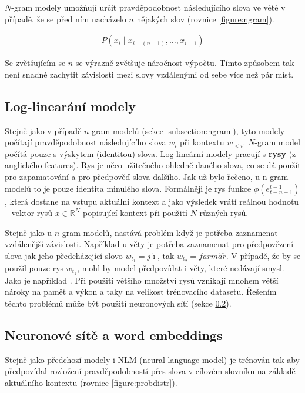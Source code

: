 $N$-gram modely umožňují určit pravděpodobnost následujícího slova ve větě v případě, že se před ním nacházelo $n$ nějakých slov (rovnice \ref{figure:ngram}).

\begin{align}\label{figure:ngram}
    P(x_{i}\mid x_{{i-(n-1)}},\dots ,x_{{i-1}})
\end{align}

Se zvětšujícím se $n$ se výrazně zvětšuje náročnost výpočtu. Tímto způsobem tak není snadné zachytit závislosti mezi slovy vzdálenými od sebe více než pár míst.

\subsection{Log-linearání modely} \label{subsection:loglinear}
Stejně jako v případě $n$-gram modelů (sekce \ref{subsection:ngram}), tyto modely počítají pravděpodobnost následujícího slova $w_i$ při kontextu $w_{<i}$. $N$-gram model počítá pouze s výskytem (identitou) slova. Log-lineární modely pracují s \textbf{rysy} (z anglického features). Rys je něco užitečného ohledně daného slova, co se dá použít pro zapamatování a pro předpověď slova dalšího. Jak už bylo řečeno, u n-gram modelů to je pouze identita minulého slova. Formálněji je rys funkce $\phi(e^{t-1}_{t-n+1})$, která dostane na vstupu aktuální kontext a jako výsledek vrátí reálnou hodnotu -- vektor rysů $x \in \mathbb{R}^N$ popisující kontext při použití $N$ různých rysů.

Stejně jako u $n$-gram modelů, nastává problém když je potřeba zaznamenat vzdálenější závislosti. Například u věty  je potřeba zaznamenat pro předpovězení slova  jak jeho předcházející slovo $w_{t_1}=j\acute{\imath}$, tak $w_{t_2}=farm\acute{a}\check{r}$. V případě, že by se použil pouze rys $w_{t_1}$, mohl by model předpovídat i věty, které nedávají smysl. Jako je například . Při použití většího množství rysů vznikají mnohem větší nároky na paměť a výkon a taky na velikost trénovacího datasetu. Řešením těchto problémů může být použití neuronových sítí (sekce \ref{subsection:neuralembeddings}).


\subsection{Neuronové sítě a word embeddings}\label{subsection:neuralembeddings}
Stejně jako předchozí modely i NLM (neural language model) je trénován tak aby předpovídal rozložení pravděpodobností přes slova v cílovém slovníku na základě aktuálního kontextu (rovnice \ref{figure:probdistr}).


